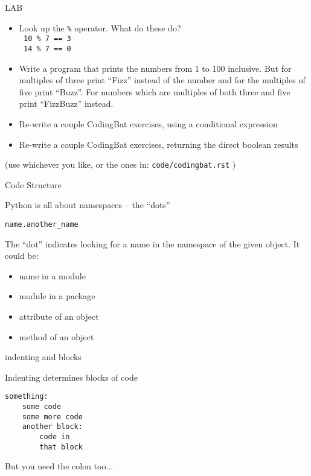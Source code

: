 \documentclass{beamer}
\begin{document}
\begin{frame}[fragile]{LAB}

\begin{itemize}
  \item Look up the \verb+%+ operator. What do these do?\\
    \verb| 10 % 7 == 3 | \\
    \verb| 14 % 7 == 0 |
  \item  Write a program that prints the numbers from 1 to 100 inclusive.
But for multiples of three print ``Fizz'' instead of the number and for the
multiples of five print ``Buzz''. For numbers which are multiples of both three
and five print ``FizzBuzz'' instead.

  \item Re-write a couple CodingBat exercises, using a conditional expression


  \item Re-write a couple CodingBat exercises, returning the direct boolean results\\
\end{itemize}

(use whichever you like, or the ones in: \verb|code/codingbat.rst| )

\end{frame}

\begin{frame}[fragile]{Code Structure}

{\Large Python is all about namespaces --  the ``dots'' }

\vfill
\verb|name.another_name|

\vfill
The ``dot'' indicates looking for a name in the namespace of the
given object. It could be:

\begin{itemize}
\item name in a module
\item module in a package
\item attribute of an object
\item method of an object
\end{itemize}

\end{frame}

\begin{frame}[fragile]{indenting and blocks}

{\Large  Indenting determines blocks of code }

\vfill
\begin{verbatim}
something:
    some code
    some more code
    another block:
        code in 
        that block
\end{verbatim}

\vfill
{\Large But you need the colon too...}

\end{frame}
\end{document}

